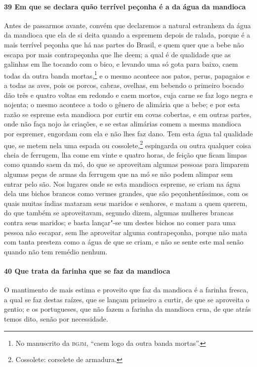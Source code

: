 \begin{linenumbers}
\paragraph{39 Em que se declara quão terrível peçonha é a da água da mandioca}\quad
Antes de passarmos avante, convém que declaremos a natural estranheza da água da mandioca
que ela de si deita quando a espremem depois de ralada, porque é a mais terrível peçonha
que há nas partes do Brasil, e quem quer que a bebe não escapa por mais contrapeçonha que
lhe deem; a qual é de qualidade que as galinhas em lhe tocando com o bico, e levando uma
só gota para baixo, caem todas da outra banda mortas,\footnote{ No manuscrito da
\textsc{bgjm}, ``caem logo da outra banda mortas''.} e o mesmo acontece aos patos, perus,
papagaios e a todas as aves, pois os porcos, cabras, ovelhas, em bebendo o primeiro bocado
dão três e quatro voltas em redondo e caem mortos, cuja carne se faz logo negra e nojenta;
o mesmo acontece a todo o gênero de alimária que a bebe; e por esta razão se espreme esta
mandioca por curtir em covas cobertas, e em outras partes, onde não faça nojo às criações,
e se estas alimárias comem a mesma mandioca por espremer, engordam com ela e não lhes faz
dano. Tem esta água tal qualidade que, se metem nela uma espada ou cossolete,\footnote{Cossolete: 
corselete de armadura.} espingarda
ou outra qualquer coisa cheia de ferrugem, lha come em vinte
e quatro horas, de feição que ficam limpas como quando saem da mó, do que se aproveitam
algumas pessoas para limparem algumas peças de armas da ferrugem que na mó se não podem
alimpar sem entrar pelo são. Nos lugares onde se esta mandioca espreme, se criam na água
dela uns bichos brancos como vermes grandes, que são peçonhentíssimos, com os quais muitas
índias mataram seus maridos e senhores, e matam a quem querem, do que também se
aproveitavam, segundo dizem, algumas mulheres brancas contra seus maridos; e basta
lançar"-se um destes bichos no comer para uma pessoa não escapar, sem lhe aproveitar alguma
contrapeçonha, porque não mata com tanta presteza como a água de que se criam, e não se
sente este mal senão quando não tem remédio nenhum.

\paragraph{40 Que trata da farinha que se faz da mandioca}\quad
O mantimento de mais estima e proveito que faz da mandioca é a farinha fresca, a qual se
faz destas raízes, que se lançam primeiro a curtir, de que se aproveita o gentio; e os
portugueses, que não fazem a farinha da mandioca crua, de que atrás temos dito, senão por
necessidade.


\end{linenumbers}
